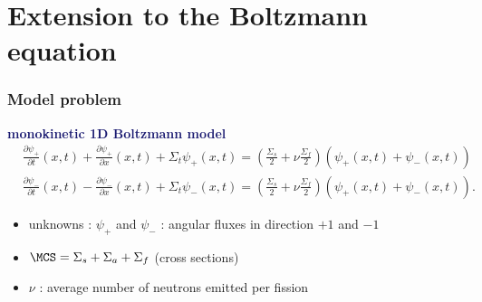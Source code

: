 \documentclass[aspectratio=169]{beamer}
\begin{document}
\section{Extension to the Boltzmann equation}
\begin{frame}
  \frametitle{Model problem}
  \textcolor{midnightblue}{\textbf{monokinetic 1D Boltzmann model}}
  \begin{equation*}
  \begin{split}
    & \frac{\partial \psi_{+}}{\partial t} (x,t) + \frac{\partial \psi_{+}}{\partial x} (x,t) + \Sigma_{t} \psi_{+}(x,t) = \left(\frac{\Sigma_s}{2} + \nu \frac{\Sigma_f}{2}\right) \left(\psi_{+}(x,t) + \psi_{-}(x,t)\right)  \\
    & \frac{\partial \psi_{-}}{\partial t} (x,t) - \frac{\partial \psi_{-}}{\partial x} (x,t) + \Sigma_{t} \psi_{-}(x,t) = \left(\frac{\Sigma_s}{2} + \nu \frac{\Sigma_f}{2}\right) \left(\psi_{+}(x,t) + \psi_{-}(x,t)\right).
    \end{split}
  \end{equation*}
  \begin{itemize}
  \item
    \textcolor{cadmiumgreen}{unknowns} : $\psi_{+}$ and $\psi_{-}$ : angular fluxes in direction $+1$ and $-1$
    \\
    \vspace*{0.2 cm}
  \item
    $\MCS = \Sigma_s + \Sigma_a + \Sigma_f$ (cross sections)
    \\
        \vspace*{0.2 cm}
  \item
    $\nu$ : average number of neutrons emitted per fission
    \end{itemize}
\end{frame}
\end{document}
